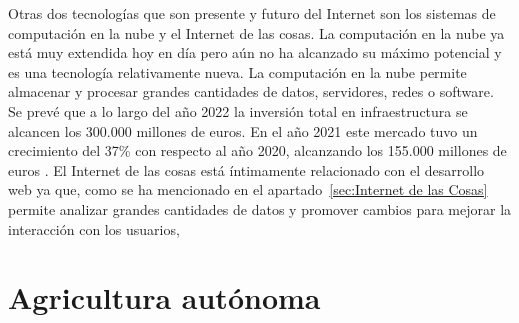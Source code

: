 \documentclass[a4paper, 12pt, oneside]{book}
\begin{document}
Otras dos tecnologías que son presente y futuro del Internet son los sistemas de computación en la nube y el Internet de las cosas. La computación en la nube ya está muy extendida hoy en día pero aún no ha alcanzado su máximo potencial y es una tecnología relativamente nueva. La computación en la nube permite almacenar y procesar grandes cantidades de datos, servidores, redes o software. Se prevé que a lo largo del año 2022 la inversión total en infraestructura se alcancen los 300.000 millones de euros. En el año 2021 este mercado tuvo un crecimiento del 37\% con respecto al año 2020, alcanzando los 155.000 millones de euros \cite{nube}.
El Internet de las cosas está íntimamente relacionado con el desarrollo web ya que, como se ha mencionado en el apartado~\ref{sec:Internet de las Cosas} permite analizar grandes cantidades de datos y promover cambios para mejorar la interacción con los usuarios, 


\section{Agricultura autónoma}
\label{sec:agricultura autonoma}
\end{document}
